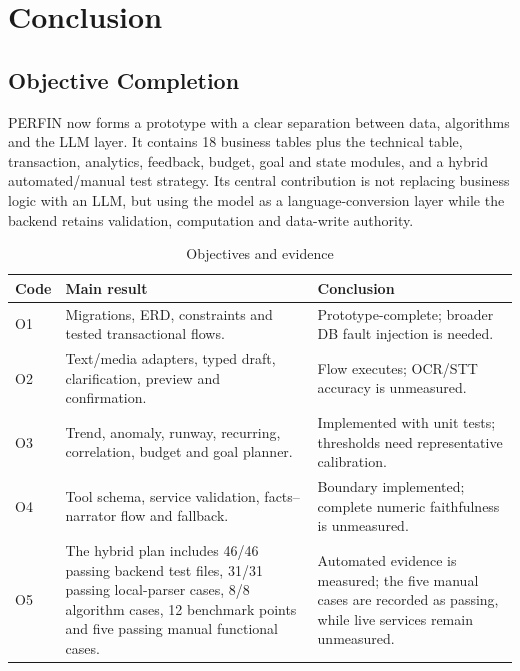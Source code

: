 \chapter{Conclusion}
\label{chap:conclusion}

\section{Objective Completion}

PERFIN now forms a prototype with a clear separation between data, algorithms and the LLM layer. It contains 18 business tables plus the technical  table, transaction, analytics, feedback, budget, goal and state modules, and a hybrid automated/manual test strategy. Its central contribution is not replacing business logic with an LLM, but using the model as a language-conversion layer while the backend retains validation, computation and data-write authority.

\begin{table}[H]
  \centering
  \caption{Objectives and evidence}
  \label{tab:objective-evidence}
  \begin{tabularx}{\textwidth}{@{}L{1.0cm}Y Y@{}}
    \toprule
    \textbf{Code} & \textbf{Main result} & \textbf{Conclusion} \\
    \midrule
    O1 & Migrations, ERD, constraints and tested transactional flows. & Prototype-complete; broader DB fault injection is needed. \\
    O2 & Text/media adapters, typed draft, clarification, preview and confirmation. & Flow executes; OCR/STT accuracy is unmeasured. \\
    O3 & Trend, anomaly, runway, recurring, correlation, budget and goal planner. & Implemented with unit tests; thresholds need representative calibration. \\
    O4 & Tool schema, service validation, facts--narrator flow and fallback. & Boundary implemented; complete numeric faithfulness is unmeasured. \\
    O5 & The hybrid plan includes 46/46 passing backend test files, 31/31 passing local-parser cases, 8/8 algorithm cases, 12 benchmark points and five passing manual functional cases. & Automated evidence is measured; the five manual cases are recorded as passing, while live services remain unmeasured. \\
    \bottomrule
  \end{tabularx}
\end{table}

